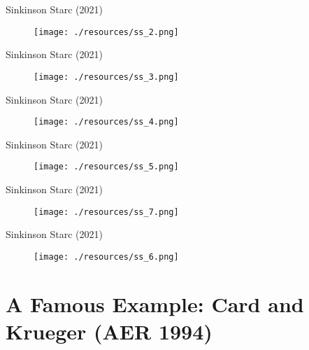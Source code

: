 \begin{frame}{Sinkinson Starc (2021)}
\begin{figure}
\centering
\texttt{[image: ./resources/ss\_2.png]}
\end{figure}
\end{frame}

\begin{frame}{Sinkinson Starc (2021)}
\begin{figure}
\centering
\texttt{[image: ./resources/ss\_3.png]}
\end{figure}
\end{frame}

\begin{frame}{Sinkinson Starc (2021)}
\begin{figure}
\centering
\texttt{[image: ./resources/ss\_4.png]}
\end{figure}
\end{frame}

\begin{frame}{Sinkinson Starc (2021)}
\begin{figure}
\centering
\texttt{[image: ./resources/ss\_5.png]}
\end{figure}
\end{frame}

\begin{frame}{Sinkinson Starc (2021)}
\begin{figure}
\centering
\texttt{[image: ./resources/ss\_7.png]}
\end{figure}
\end{frame}


\begin{frame}{Sinkinson Starc (2021)}
\begin{figure}
\centering
\texttt{[image: ./resources/ss\_6.png]}
\end{figure}
\end{frame}



\section{A Famous Example: Card and Krueger (AER 1994)}

